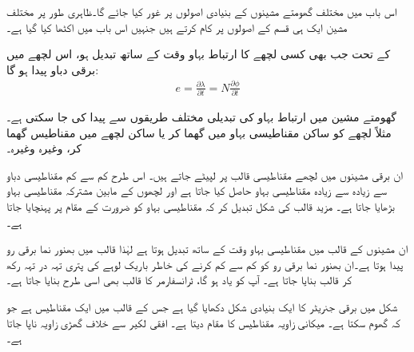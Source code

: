 اس باب میں مختلف گھومتے مشینوں کے بنیادی اصولوں پر غور کیا جائے گا۔ظاہری طور پر مختلف مشین ایک ہی قسم کے اصولوں پر کام کرتے ہیں جنہیں اس باب میں اکٹھا کیا گیا ہے۔

 کے تحت جب بھی کسی لچھے کا ارتباط بہاو   وقت کے ساتھ تبدیل ہو، اس لچھے میں برقی دباو پیدا ہو گا:
\begin{align}
e=\frac{\partial \lambda}{\partial t}=N \frac{\partial \phi}{\partial t}
\end{align}

گھومتے مشین میں ارتباط بہاو کی تبدیلی مختلف طریقوں سے پیدا کی جا سکتی ہے۔مثلاً  لچھے کو ساکن مقناطیسی بہاو میں گھما کر یا  ساکن لچھے میں مقناطیس گھما کر، وغیرہ وغیرہ۔

ان برقی مشینوں میں لچھے مقناطیسی قالب  پر لپیٹے جاتے ہیں۔ اس طرح کم سے کم مقناطیسی دباو سے زیادہ سے زیادہ مقناطیسی بہاو حاصل کیا جاتا ہے اور لچھوں کے مابین مشترکہ مقناطیسی بہاو بڑھایا جاتا ہے۔ مزید قالب کی شکل تبدیل کر کہ مقناطیسی بہاو کو ضرورت کے مقام پر پہنچایا جاتا ہے۔

ان مشینوں کے قالب میں مقناطیسی بہاو وقت کے ساتھ تبدیل ہوتا ہے لہٰذا قالب میں بھنور نما برقی رو پیدا ہوتا ہے۔ان بھنور نما برقی رو کو کم سے کم کرنے کی خاطر  باریک لوہے کی پتری تہہ در تہہ رکھ کر  قالب بنایا جاتا ہے۔   آپ کو یاد ہو گا، ٹرانسفارمر کا قالب بھی اسی طرح بنایا جاتا ہے۔

شکل   میں  برقی جنریٹر کا ایک بنیادی شکل دکھایا گیا ہے جس کے قالب میں ایک مقناطیس ہے جو کہ گھوم سکتا ہے۔   میکانی زاویہ  مقناطیس کا مقام دیتا ہے۔ افقی لکیر سے خلاف گھڑی  زاویہ  ناپا جاتا ہے۔

